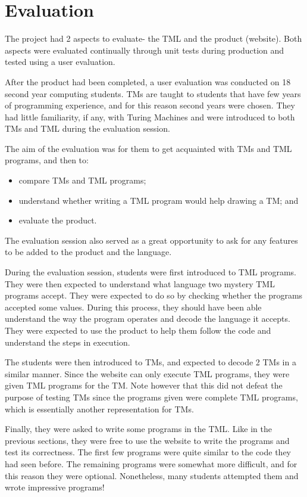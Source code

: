 \chapter{Evaluation} 
The project had 2 aspects to evaluate- the TML and the product (website). Both aspects were evaluated continually through unit tests during production and tested using a user evaluation.

After the product had been completed, a user evaluation was conducted on 18 second year computing students. TMs are taught to students that have few years of programming experience, and for this reason second years were chosen. They had little familiarity, if any, with Turing Machines and were introduced to both TMs and TML during the evaluation session. 

The aim of the evaluation was for them to get acquainted with TMs and TML programs, and then to:
\begin{itemize}
    \item compare TMs and TML programs;
    \item understand whether writing a TML program would help drawing a TM; and
    \item evaluate the product.
\end{itemize}
The evaluation session also served as a great opportunity to ask for any features to be added to the product and the language.

During the evaluation session, students were first introduced to TML programs. They were then expected to understand what language two mystery TML programs accept. They were expected to do so by checking whether the programs accepted some values. During this process, they should have been able understand the way the program operates and decode the language it accepts. They were expected to use the product to help them follow the code and understand the steps in execution. 

The students were then introduced to TMs, and expected to decode 2 TMs in a similar manner. Since the website can only execute TML programs, they were given TML programs for the TM. Note however that this did not defeat the purpose of testing TMs since the programs given were complete TML programs, which is essentially another representation for TMs.

Finally, they were asked to write some programs in the TML. Like in the previous sections, they were free to use the website to write the programs and test its correctness. The first few programs were quite similar to the code they had seen before. The remaining programs were somewhat more difficult, and for this reason they were optional. Nonetheless, many students attempted them and wrote impressive programs! 

